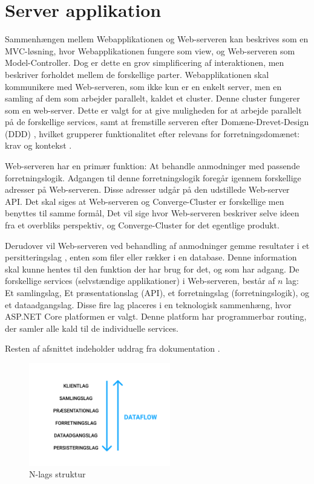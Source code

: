 
\section{Server applikation}

Sammenhængen mellem Webapplikationen og Web-serveren kan beskrives som en MVC-løsning, hvor Webapplikationen fungere som view, og Web-serveren som Model-Controller. Dog er dette en grov simplificering af interaktionen, men beskriver forholdet mellem de forskellige parter. Webapplikationen skal kommunikere med Web-serveren, som ikke kun er en enkelt server, men en samling af dem som arbejder parallelt, kaldet et cluster. Denne cluster fungerer som en web-server. Dette er valgt for at give muligheden for at arbejde parallelt på de forskellige services, samt at fremstille serveren efter Domæne-Drevet-Design (DDD) \cite[DDD]{converge-terms}, hvilket grupperer funktionalitet efter relevans for forretningsdomænet: krav og kontekst \cite{documentation-kravspec}.

Web-serveren har en primær funktion: At behandle anmodninger med passende forretningslogik. Adgangen til denne forretningslogik foregår igennem forskellige adresser på Web-serveren. Disse adresser udgår på den udstillede Web-server API. Det skal siges at Web-serveren og Converge-Cluster er forskellige men benyttes til samme formål, Det vil sige hvor Web-serveren beskriver selve ideen fra et overbliks perspektiv, og Converge-Cluster for det egentlige produkt.

Derudover vil Web-serveren ved behandling af anmodninger gemme resultater i et persitteringslag \cite[Permitteringslag]{converge-terms}, enten som filer eller rækker i en database. Denne information skal kunne hentes til den funktion der har brug for det, og som har adgang. De forskellige services (selvstændige applikationer) i Web-serveren,  består af $n$ lag: Et samlingslag, Et præsentationslag (API), et forretningslag (forretningslogik), og et dataadgangslag. Disse fire lag placeres i en teknologisk sammenhæng, hvor ASP.NET Core platformen er valgt. Denne platform har programmerbar routing, der samler alle kald til de individuelle services.

Resten af afsnittet indeholder uddrag fra dokumentation \cite{software-architecture}.

\begin{figure}[H]
  \begin{small}
    \begin{center}
      \includegraphics[width=0.55\textwidth]{Billeder/N-lag.pdf}
    \end{center}
    \caption{N-lags struktur}
    \label{fig:n-layer}
  \end{small}
\end{figure}

